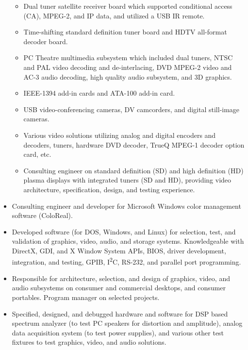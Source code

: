 \documentclass[10pt,letterpaper,oneside]{report}
\begin{document}
\begin{itemize}
\begin {itemize}
      \item Dual tuner satellite receiver board which supported conditional
        access (CA), MPEG-2, and IP data, and utilized a USB IR remote.

      \item Time-shifting standard definition tuner board and HDTV all-format
        decoder board.

      \item PC Theatre multimedia subsystem which included dual tuners, NTSC and
        PAL video decoding and de-interlacing, DVD MPEG-2 video and AC-3 audio
        decoding, high quality audio subsystem, and 3D graphics.

      \item IEEE-1394 add-in cards and ATA-100 add-in card.

      \item USB video-conferencing cameras, DV camcorders, and digital
        still-image cameras.

      \item Various video solutions utilizing analog and digital encoders and
        decoders, tuners, hardware DVD decoder, TrueQ MPEG-1 decoder option
        card, etc.

      \item Consulting engineer on standard definition (SD) and high definition
        (HD) plasma displays with integrated tuners (SD and HD), providing video
        architecture, specification, design, and testing experience.
    \end{itemize}

  \item Consulting engineer and developer for Microsoft Windows color
    management software (ColoReal).

  \item Developed software (for DOS, Windows, and Linux) for selection, test,
    and validation of graphics, video, audio, and storage systems.
    Knowledgeable with DirectX, GDI, and X Window System APIs, BIOS, driver
    development, integration, and testing, GPIB, I\textsuperscript{2}C, RS-232,
    and parallel port programming.

  \item Responsible for architecture, selection, and design of graphics, video,
    and audio subsystems on consumer and commercial desktops, and consumer
    portables. Program manager on selected projects.

  \item Specified, designed, and debugged hardware and software for DSP based
    spectrum analyzer (to test PC speakers for distortion and amplitude), analog
    data acquisition system (to test power supplies), and various other test
    fixtures to test graphics, video, and audio solutions.
\end{itemize}
\end{document}
